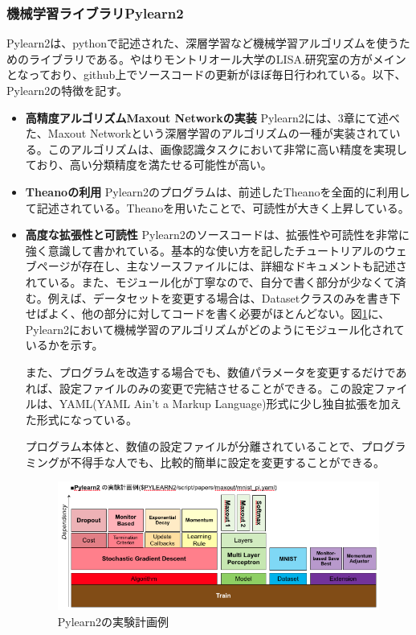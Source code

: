 \subsubsection{機械学習ライブラリPylearn2}
Pylearn2は、pythonで記述された、深層学習など機械学習アルゴリズムを使うためのライブラリである\cite{goodfellow2013Pylearn2:}。やはりモントリオール大学のLISA.研究室の方がメインとなっており、github上でソースコードの更新がほぼ毎日行われている。以下、Pylearn2の特徴を記す。
\begin{itemize}
\item \textbf{高精度アルゴリズムMaxout Networkの実装}
Pylearn2には、3章にて述べた、Maxout Networkという深層学習のアルゴリズムの一種が実装されている。このアルゴリズムは、画像認識タスクにおいて非常に高い精度を実現しており、高い分類精度を満たせる可能性が高い。
\item \textbf{Theanoの利用}
Pylearn2のプログラムは、前述したTheanoを全面的に利用して記述されている。Theanoを用いたことで、可読性が大きく上昇している。
\item \textbf{高度な拡張性と可読性}
Pylearn2のソースコードは、拡張性や可読性を非常に強く意識して書かれている。基本的な使い方を記したチュートリアルのウェブページが存在し、主なソースファイルには、詳細なドキュメントも記述されている。また、モジュール化が丁寧なので、自分で書く部分が少なくて済む。例えば、データセットを変更する場合は、Datasetクラスのみを書き下せばよく、他の部分に対してコードを書く必要がほとんどない。図\ref{c4_Pylearn2_yaml}に、Pylearn2において機械学習のアルゴリズムがどのようにモジュール化されているかを示す。\par
また、プログラムを改造する場合でも、数値パラメータを変更するだけであれば、設定ファイルのみの変更で完結させることができる。この設定ファイルは、YAML(YAML Ain't a Markup Language)形式に少し独自拡張を加えた形式になっている。\par
プログラム本体と、数値の設定ファイルが分離されていることで、プログラミングが不得手な人でも、比較的簡単に設定を変更することができる。\par
\begin{figure}[tbp]
 \begin{center}
  \includegraphics[width=120mm]{img/c4/Pylearn2_yaml}
 \end{center}
 \caption{Pylearn2の実験計画例}
 \label{c4_Pylearn2_yaml}
\end{figure}
\end{itemize}

